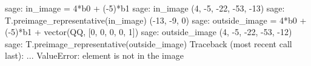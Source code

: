%
\begin{sageexample}
sage: in_image = 4*b0 + (-5)*b1
sage: in_image
(4, -5, -22, -53, -13)
sage: T.preimage_representative(in_image)
(-13, -9, 0)
sage: outside_image = 4*b0 + (-5)*b1 + vector(QQ, [0, 0, 0, 0, 1])
sage: outside_image
(4, -5, -22, -53, -12)
sage: T.preimage_representative(outside_image)
Traceback (most recent call last):
...
ValueError: element is not in the image
\end{sageexample}
%
\begin{sageverbatim}
\end{sageverbatim}
%
